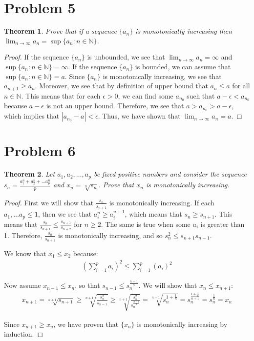 \documentclass[psamsfonts]{amsart}
\newtheorem{thm}{Theorem}[section]
\theoremstyle{definition}
\theoremstyle{remark}
\numberwithin{equation}{section}
\begin{document}
\section{Problem 5}

\begin{thm}
Prove that if a sequence $\{ a_n \}$ is monotonically increasing then $\lim_{n \to \infty} a_n = \sup \{ a_n : n \in \mathbb{N} \}$.
\end{thm}

\begin{proof}
If the sequence $\{ a_n \}$ is unbounded, we see that $\lim_{n \to \infty} a_n = \infty$ and $\sup \{ a_n : n \in \mathbb{N} \} = \infty$. If the sequence $\{ a_n \}$ is bounded, we can assume that $\sup \{a _n: n \in \mathbb{N} \} = a$. Since $\{a_n \}$ is monotonically increasing, we see that $a_{n+1} \geq a_n$. Moreover, we see that by definition of upper bound that $a_n \leq a$ for all $n \in \mathbb{N}$. This means that for each $\epsilon > 0$, we can find some $a_{n_0}$ such that $a - \epsilon < a_{n_0}$ because $a - \epsilon$ is not an upper bound. Therefore, we see that $a > a_{n_0} > a - \epsilon$, which implies that $|a_{n_0} - a| < \epsilon$. Thus, we have shown that $\lim_{n \to \infty} a_n = a$. 
\end{proof}

\section{Problem 6}

\begin{thm}
Let $a_1, a_2, \ldots, a_p$ be fixed positive numbers and consider the sequence $s_n = \frac{a_1^n + a_2^n + \ldots a_p^n}{p}$ and $x_n = \sqrt[n]{s_n}$. Prove that $x_n$ is monotonically increasing. 
\end{thm}

\begin{proof}
First we will show that $\frac{s_n}{s_{n+1}}$ is monotonically increasing. If each $a_1, \ldots a_p \leq 1$, then we see that $a_i^n \geq a_i^{n+1}$, which means that $s_{n} \geq s_{n+1}$. This means that $\frac{s_n}{s_{n+1}} \leq \frac{s_{n+1}}{s_{n+2}}$ for $n \geq 2$. The same is true when some $a_i$ is greater than 1. Therefore, $\frac{s_n}{s_{n+1}}$ is monotonically increasing, and so $s_n^2 \leq s_{n+1} s_{n-1}$. 

We know that $x_1 \leq x_2$ because:
\begin{eqnarray}
\left( \sum_{i=1}^p a_i \right)^2 \leq \sum_{i=1}^p (a_i)^2
\end{eqnarray}

Now assume $x_{n-1} \leq x_n$, so that $s_{n-1} \leq s_n^{\frac{n-1}{n}}$. We will show that $x_n \leq x_{n+1}$:
\begin{eqnarray}
x_{n+1} = \sqrt[n+1]{s_{n+1}} \geq \sqrt[n+1]{\frac{s_{n}^2}{s_{n-1}}} \geq \sqrt[n+1]{\frac{s_n^2}{s_n^{\frac{n-1}{n}}}} = \sqrt[n+1]{s_n^{1 + \frac{1}{n}}} = s_n^{\frac{1 + \frac{1}{n}}{n+1}} = s_n^\frac{1}{n} = x_n 
\end{eqnarray}

Since $x_{n+1} \geq x_n$, we have proven that $\{x_n \}$ is monotonically increasing by induction. 
\end{proof}
\end{document}
